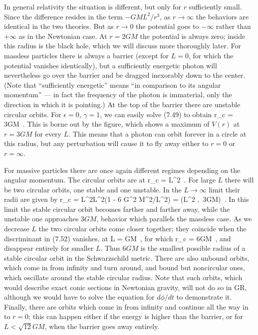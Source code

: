 In general relativity the situation is different, but only for $r$ 
sufficiently small.  Since the difference resides in the term $-GML^2/r^3$,
as $r\rightarrow\infty$ the behaviors are identical in the two 
theories.  But as $r\rightarrow 0$ the potential goes to $-\infty$
rather than $+\infty$ as in the Newtonian case.  At $r=2GM$ the 
potential is always zero; inside this radius is the black hole, which
we will discuss more thoroughly later.   For massless particles
there is always a barrier (except for $L=0$, for which the potential
vanishes identically), but a sufficiently energetic photon will
nevertheless go over the barrier and be dragged inexorably down to
the center.  (Note that ``sufficiently energetic'' means ``in comparison
to its angular momentum'' --- in fact the frequency of the photon is
immaterial, only the direction in which it is pointing.)  At the top
of the barrier there are unstable circular orbits.
For $\epsilon=0$, $\gamma=1$, we can easily solve (7.49) to obtain
\be
  r_c = 3GM\ .\label{7.51}
\ee
This is borne out by the figure, which shows a maximum of $V(r)$ at
$r=3GM$ for every $L$.  This means that a photon can orbit forever in
a circle at this radius, but any 
perturbation will cause it to fly away either to $r=0$ or
$r=\infty$.

\begin{figure}
  \centerline{
  }
  \vskip-2cm
\end{figure}

\begin{figure}
  \centerline{
  }
  \vskip-2cm
\end{figure}

For massive particles there are once again different regimes depending
on the angular momentum.  The circular orbits are at
\be
  r_c = {{L^2\pm {}}}\ .\label{7.52}
\ee
For large $L$ there will be two circular orbits, one stable and one 
unstable.  In the $L\rightarrow\infty$ limit their radii are given by
\be
  r_c = {{L^2\pm L^2(1 - 6 G^2 M^2/L^2)}} =
  \left({{L^2}} ,\ 3GM\right)\ .\label{7.53}
\ee
In this limit the stable circular orbit becomes farther and farther 
away, while the unstable one approaches $3GM$, behavior which parallels 
the massless case.  As we decrease $L$ the two circular
orbits come closer together; they coincide when the discriminant in
(7.52) vanishes, at
\be
  L = GM\ ,\label{7.54}
\ee
for which
\be
  r_c = 6GM\ ,\label{7.55}
\ee
and disappear entirely for smaller $L$.  Thus $6GM$ is the smallest 
possible radius of a stable circular orbit in the 
Schwarzschild metric.  There are also unbound orbits, which come in 
from infinity and turn around, and bound but noncircular ones, which
oscillate around the stable circular radius.  Note that such
orbits, which would describe exact conic sections in
Newtonian gravity, will not do so in GR, although we would have to
solve the equation for $d\phi/dt$ to demonstrate it.  Finally, there are
orbits which come in from infinity and continue all the way in to 
$r=0$; this can happen either if the energy is higher than the barrier,
or for $L<\sqrt{12}GM$, when the barrier goes away entirely.

